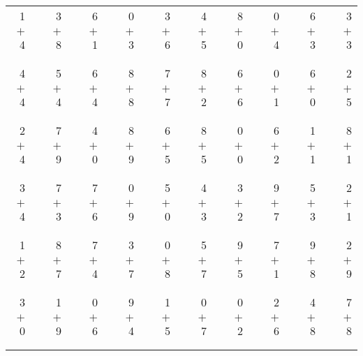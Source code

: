 \documentclass[12pt, letterpaper]{article}
\begin{document}
\begin{tabular}{rrrrrrrrrrrrrrrrrrr}
1 & & 3 & & 6 & & 0 & & 3 & & 4 & & 8 & & 0 & & 6 & & 3\\
$+$ 4 & & $+$ 8 & & $+$ 1 & & $+$ 3 & & $+$ 6 & & $+$ 5 & & $+$ 0 & & $+$ 4 & & $+$ 3 & & $+$ 3\\
\cline{1-1} \cline{3-3} \cline{5-5} \cline{7-7} \cline{9-9} \cline{11-11} \cline{13-13} \cline{15-15} \cline{17-17} \cline{19-19} \\ \\
4 & & 5 & & 6 & & 8 & & 7 & & 8 & & 6 & & 0 & & 6 & & 2\\
$+$ 4 & & $+$ 4 & & $+$ 4 & & $+$ 8 & & $+$ 7 & & $+$ 2 & & $+$ 6 & & $+$ 1 & & $+$ 0 & & $+$ 5\\
\cline{1-1} \cline{3-3} \cline{5-5} \cline{7-7} \cline{9-9} \cline{11-11} \cline{13-13} \cline{15-15} \cline{17-17} \cline{19-19} \\ \\
2 & & 7 & & 4 & & 8 & & 6 & & 8 & & 0 & & 6 & & 1 & & 8\\
$+$ 4 & & $+$ 9 & & $+$ 0 & & $+$ 9 & & $+$ 5 & & $+$ 5 & & $+$ 0 & & $+$ 2 & & $+$ 1 & & $+$ 1\\
\cline{1-1} \cline{3-3} \cline{5-5} \cline{7-7} \cline{9-9} \cline{11-11} \cline{13-13} \cline{15-15} \cline{17-17} \cline{19-19} \\ \\
3 & & 7 & & 7 & & 0 & & 5 & & 4 & & 3 & & 9 & & 5 & & 2\\
$+$ 4 & & $+$ 3 & & $+$ 6 & & $+$ 9 & & $+$ 0 & & $+$ 3 & & $+$ 2 & & $+$ 7 & & $+$ 3 & & $+$ 1\\
\cline{1-1} \cline{3-3} \cline{5-5} \cline{7-7} \cline{9-9} \cline{11-11} \cline{13-13} \cline{15-15} \cline{17-17} \cline{19-19} \\ \\
1 & & 8 & & 7 & & 3 & & 0 & & 5 & & 9 & & 7 & & 9 & & 2\\
$+$ 2 & & $+$ 7 & & $+$ 4 & & $+$ 7 & & $+$ 8 & & $+$ 7 & & $+$ 5 & & $+$ 1 & & $+$ 8 & & $+$ 9\\
\cline{1-1} \cline{3-3} \cline{5-5} \cline{7-7} \cline{9-9} \cline{11-11} \cline{13-13} \cline{15-15} \cline{17-17} \cline{19-19} \\ \\
3 & & 1 & & 0 & & 9 & & 1 & & 0 & & 0 & & 2 & & 4 & & 7\\
$+$ 0 & & $+$ 9 & & $+$ 6 & & $+$ 4 & & $+$ 5 & & $+$ 7 & & $+$ 2 & & $+$ 6 & & $+$ 8 & & $+$ 8\\
\cline{1-1} \cline{3-3} \cline{5-5} \cline{7-7} \cline{9-9} \cline{11-11} \cline{13-13} \cline{15-15} \cline{17-17} \cline{19-19} \\ \\

\end{tabular}
\end{document}
